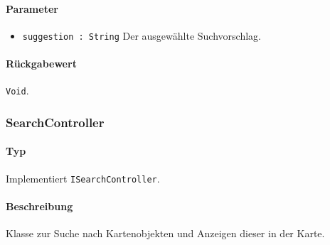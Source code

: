 \paragraph*{Parameter}
\begin{itemize}
    \item \texttt{suggestion : String} Der ausgewählte Suchvorschlag.
\end{itemize}
\paragraph*{Rückgabewert}
\texttt{Void}.


\subsubsection{SearchController}\label{App_Search_SearchController}
\paragraph*{Typ}
Implementiert \texttt{ISearchController}.
\paragraph*{Beschreibung}
Klasse zur Suche nach Kartenobjekten und Anzeigen dieser in der Karte.